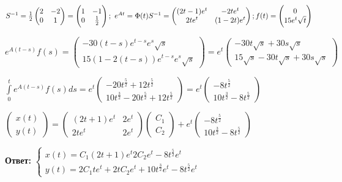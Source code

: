 \documentclass[12pt]{article}
\begin{document}
\begin{Example}{}
    $S^{-1} = \frac{1}{2} \begin{pmatrix}
        2 & -2 \\
        0 & 1
    \end{pmatrix} = \begin{pmatrix}
        1 & -1 \\
        0 & \frac{1}{2}
    \end{pmatrix};\ e^{At} = \Phi(t)S^{-1} = \begin{pmatrix}
        (2t - 1)e^t & -2te^t \\
        2te^t & (1 - 2t)e^t
    \end{pmatrix};\\ f(t) = \begin{pmatrix}
        0 \\
        15e^t\sqrt{t}
    \end{pmatrix}$

    $e^{A(t - s)}f(s) = \begin{pmatrix}
        -30(t - s)e^{t - s}e^s\sqrt{s} \\
        15(1 - 2(t - s))e^{t - s}e^s\sqrt{s}
    \end{pmatrix} = e^t \begin{pmatrix}
        -30t\sqrt{s} + 30s\sqrt{s} \\
        15\sqrt{s} - 30t\sqrt{s} + 30s\sqrt{s}
    \end{pmatrix}$

    $\int\limits_0^t e^{A(t - s)}f(s)ds = e^t \begin{pmatrix}
        -20t^\frac{5}{2} + 12t^\frac{5}{2} \\
        10t^\frac{3}{2} - 20t^\frac{5}{2} + 12t^\frac{5}{2}
    \end{pmatrix} = e^t \begin{pmatrix}
        -8t^\frac{5}{2} \\
        10t^\frac{3}{2} - 8t^\frac{5}{2}
    \end{pmatrix}$

    $\begin{pmatrix}
        x(t) \\
        y(t)
    \end{pmatrix} = \begin{pmatrix}
        (2t + 1)e^t & 2e^t \\
        2te^t & 2e^t 
    \end{pmatrix} \begin{pmatrix}
        C_1 \\
        C_2
    \end{pmatrix} + e^t \begin{pmatrix}
        -8t^\frac{5}{2} \\
        10t^\frac{3}{2} - 8t^\frac{5}{2}
    \end{pmatrix}$

    \textbf{Ответ:} $\begin{cases}
        x(t) = C_1(2t + 1)e^t 2C_2e^t - 8t^\frac{5}{2}e^t \\
        y(t) = 2C_1te^t + 2tC_2e^t + 10t^\frac{3}{2}e^t - 8t^\frac{5}{2}e^t
    \end{cases}$
\end{Example}
\end{document}
